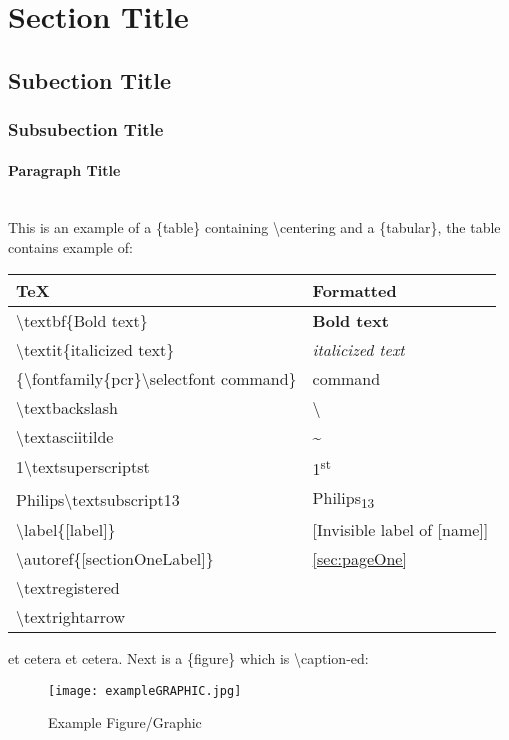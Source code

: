 \section{Section Title} \label{sec:pageOne}

\subsection{Subection Title} \label{ssec:ssecOne}
\subsubsection{Subsubection Title} \label{sssec:sssecOne}
\paragraph{Paragraph Title} \label{par:parOne} ~\\

This is an example of a \{table\} containing \textbackslash{}centering and a \{tabular\}, the table contains example of:
\begin{table}[H]
	\centering
	\begin{tabular}{ | C{.45\textwidth} | C{.45\textwidth} | } \hline
		\textbf{TeX} & \textbf{Formatted} \\ \hline
		\textbackslash{}textbf\{Bold text\} & \textbf{Bold text} \\
		\textbackslash{}textit\{italicized text\} & \textit{italicized text} \\
		\{\textbackslash{}fontfamily\{pcr\}\textbackslash{}selectfont command\} & {\selectfont command} \\
		\textbackslash{}textbackslash & \textbackslash \\
		\textbackslash{}textasciitilde & \textasciitilde \\
		1\textbackslash{}textsuperscript{st} & 1\textsuperscript{st} \\
		Philips\textbackslash{}textsubscript{13} & Philips\textsubscript{13} \\
		\textbackslash{}label\{[label]\} & [Invisible label of [name]] \\
		\textbackslash{}autoref\{[sectionOneLabel]\} & \autoref{sec:pageOne} \\
		\textbackslash{}textregistered & \textregistered \\
		\textbackslash{}textrightarrow & \textrightarrow \\
		\hline
	\end{tabular}
\end{table}

et cetera et cetera. Next is a \{figure\} which is \textbackslash{}caption-ed:

\begin{figure}[h!]
	\centering
	\texttt{[image: exampleGRAPHIC.jpg]}
	\caption{Example Figure/Graphic}
	\label{fig:example}
\end{figure}

